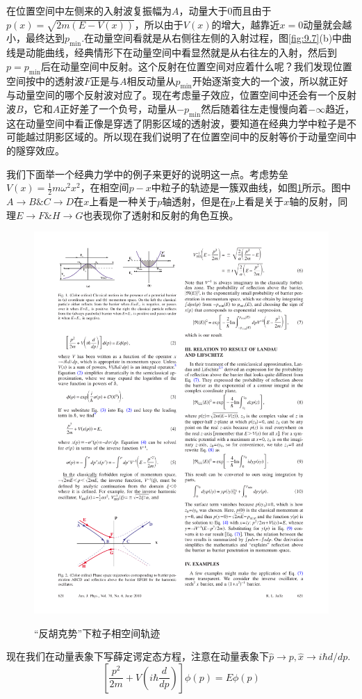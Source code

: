 \documentclass[a4paper,zihao=-4,linespread=1]{ctexrep}
\begin{document}
    在位置空间中左侧来的入射波复振幅为$A$，动量大于$0$而且由于$p(x)=\sqrt{2m(E-V(x))}$，所以由于$V(x)$的增大，越靠近$x=0$动量就会越小，最终达到$p_{\min}$.在动量空间看就是从右侧往左侧的入射过程，图\ref{fig:9.7}(b)中曲线是动能曲线，经典情形下在动量空间中看显然就是从右往左的入射，然后到$p=p_{\min}$后在动量空间中反射。这个反射在位置空间对应着什么呢？我们发现位置空间按中的透射波$F$正是与$A$相反动量从$p_{\min}$开始逐渐变大的一个波，所以就正好与动量空间的哪个反射波对应了。现在考虑量子效应，位置空间中还会有一个反射波$B$，它和$A$正好差了一个负号，动量从$-p_{\min}$然后随着往左走慢慢向着$-\infty$趋近，这在动量空间中看正像是穿透了阴影区域的透射波，要知道在经典力学中粒子是不可能越过阴影区域的。所以现在我们说明了在位置空间中的反射等价于动量空间中的隧穿效应。
    
    我们下面举一个经典力学中的例子来更好的说明这一点。考虑势垒$V(x)=\frac{1}{2}m\omega^2x^2$，在相空间$p-x$中粒子的轨迹是一簇双曲线，如图\ref{fig:9.8}所示。图中$A\to B\& C\to D$在$x$上看是一种关于$p$轴透射，但是在$p$上看是关于$x$轴的反射，同理$E\to F\& H\to G$也表现你了透射和反射的角色互换。
    \begin{figure}
    	\centering
    	\includegraphics[width=0.65\linewidth]{fig/9-8.pdf}
    	\label{fig:9.8}
    	\caption{“反胡克势”下粒子相空间轨迹}
    \end{figure}
	
	现在我们在动量表象下写薛定谔定态方程，注意在动量表象下$\hat{p}\to p,\hat{x}\to i\hbar d/dp$.
	\begin{equation}
		\label{eq:9.35}
		\left[\frac{p^2}{2m}+V(i\hbar\frac{d}{dp})\right]\phi(p)=E\phi(p)
	\end{equation}
	
\end{document}
